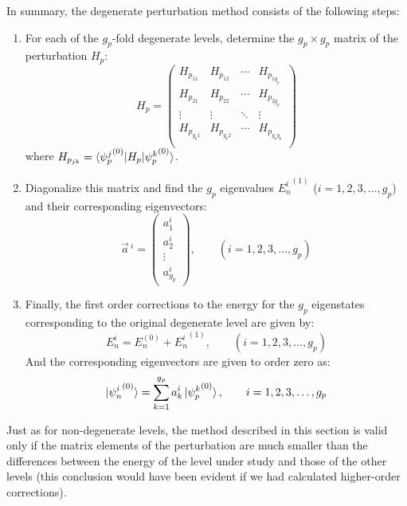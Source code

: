 In summary, the degenerate perturbation method consists of the following steps:
\begin{enumerate}
    \item For each of the $g_p$-fold degenerate levels, determine the $g_p\times g_p$ matrix of the perturbation $H_p$:
    \begin{equation}
        H_p = \begin{pmatrix}
        H_{p_{11}} & H_{p_{12}} & \cdots & H_{p_{1g_p}} \\
        H_{p_{21}} & H_{p_{22}} & \cdots & H_{p_{2g_p}} \\
        \vdots & \vdots & \ddots & \vdots \\
        H_{p_{g_p1}} & H_{p_{g_p2}} & \cdots & H_{p_{g_pg_p}} \\
        \end{pmatrix}
    \end{equation}
    where $H_{p_{jk}} = \braket{{\psi_p^j}^{(0)}|H_p|{\psi_p^k}^{(0)}}$.
    \item Diagonalize this matrix and find the $g_p$ eigenvalues ${E_n^i}^{(1)}$ ($i = 1, 2, 3, \dots, g_p$) and their corresponding eigenvectors:
    \begin{equation}
        \vec{a}\,^i = \begin{pmatrix}
            a_1^i \\ a_2^i \\ \vdots \\ a_{g_p}^i 
        \end{pmatrix},\qquad (i = 1, 2, 3, \dots, g_p)
    \end{equation} 
    \item Finally, the first order corrections to the energy for the $g_p$ eigenstates corresponding to the original degenerate level are given by:
    \begin{equation}
        E_n^i = E_n^{(0)} + {E_n^i}^{(1)},\qquad (i = 1, 2, 3, \dots, g_p)
    \end{equation}
    And the corresponding eigenvectors are given to order zero as:
    \begin{equation}
        \ket{{\psi_n^i}^{(0)}} = \sum_{k=1}^{g_p} a_k^i\ket{{\psi_p^k}^{(0)}}, \qquad i = 1, 2, 3, \dots, g_p
    \end{equation}
\end{enumerate}

Just as for non-degenerate levels, the method described in this section is valid only if the matrix elements of the perturbation are much smaller than the differences between the energy of the level under study and those of the other levels (this conclusion would have been evident if we had calculated higher-order corrections).
